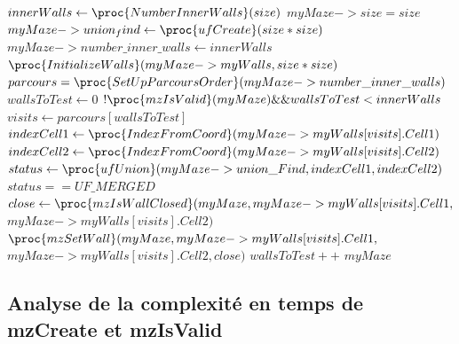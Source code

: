 \documentclass[10pt]{article}
\begin{document}
\begin{codebox}
	\li $innerWalls \gets \proc{NumberInnerWalls}(size)$
	\li $myMaze->size = size$
	\li $myMaze->union_find \gets \proc{ufCreate}(size * size)$
	\li $myMaze->number\_inner\_walls \gets innerWalls$
	\li $\proc{InitializeWalls}(myMaze->myWalls, size*size)$
	\li $parcours = \proc{SetUpParcoursOrder}(myMaze->number\_inner\_walls)$	
	\li $wallsToTest \gets 0$	
	\li \While $!\proc{mzIsValid}(myMaze) \&\& wallsToTest < innerWalls$
	\li $visits \gets parcours[wallsToTest]$
	\li \Do $indexCell1 \gets \proc{IndexFromCoord}(myMaze->myWalls[visits].Cell1)$
	\li 	$indexCell2 \gets \proc{IndexFromCoord}(myMaze->myWalls[visits].Cell2)$
	\li 	$status \gets \proc{ufUnion}(myMaze->union\_Find, indexCell1, indexCell2)$
	\li 	\If $status == UF\_MERGED$
			\Then
	\li 		$close \gets \proc{mzIsWallClosed}(myMaze, myMaze->myWalls[visits].Cell1,$ \\$myMaze->myWalls[visits].Cell2)$
	\li 		$\proc{mzSetWall}(myMaze, myMaze->myWalls[visits].Cell1,$ \\ $ myMaze->myWalls[visits].Cell2, close)$
			\End
	\li $wallsToTest++$	
		\End
	\li \Return $myMaze$
\end{codebox}
\subsection{Analyse de la complexité en temps de mzCreate et mzIsValid}
\end{document}
